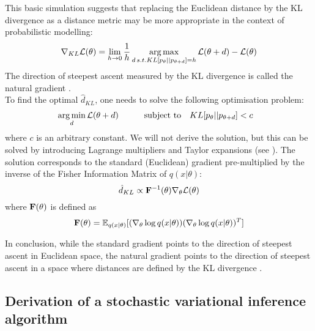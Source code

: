 This basic simulation suggests that replacing the Euclidean distance by the KL divergence as a distance metric may be more appropriate in the context of probabilistic modelling:
\[
	\nabla_{KL} \mathcal{L}(\theta) = \lim_{h\to0} \frac{1}{h}\operatorname*{arg\,max}_{d \, s.t. KL[p_\theta||p_{\theta+d}]=h} \mathcal{L}(\theta+d) - \mathcal{L}(\theta)
\]
The direction of steepest ascent measured by the KL divergence is called the natural gradient \cite{Amari1998,Martens2014}.\\
To find the optimal $\hat{d}_{KL}$, one needs to solve the following optimisation problem:
\begin{equation*} \begin{aligned}
	&\operatorname*{arg\,min}_{d} \mathcal{L}(\theta+d) \qquad
	& \text{subject to}
	& \quad KL[p_\theta||p_{\theta+d}] < c
\end{aligned} \end{equation*}
where $c$ is an arbitrary constant. We will not derive the solution, but this can be solved by introducing Lagrange multipliers and Taylor expansions (see \cite{Amari1998,Kristiadi2019}). The solution corresponds to the standard (Euclidean) gradient pre-multiplied by the inverse of the Fisher Information Matrix of $q(x|\theta)$:
\begin{equation}\label{natural_gradient}
	\hat{d}_{KL} \propto {\bf F}^{-1}(\theta) \nabla_{\theta} \mathcal{L}(\theta)
\end{equation}
where ${\bf F}(\theta)$ is defined as
\[
	{\bf F}(\theta) = \mathbb{E}_{q(x|\theta)}[(\nabla_\theta \log q(x|\theta)) (\nabla_\theta \log q(x|\theta))^T]
\]


In conclusion, while the standard gradient points to the direction of steepest ascent in Euclidean space, the natural gradient points to the direction of steepest ascent in a space where distances are defined by the KL divergence \cite{Kristiadi2019,Amari1998,Hoffman2012}.


\subsection{Derivation of a stochastic variational inference algorithm}

